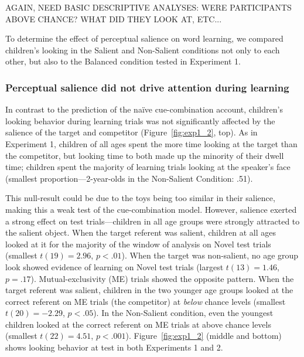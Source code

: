 \documentclass[man,floatsintext]{apa6}
\begin{document}
AGAIN, NEED BASIC DESCRIPTIVE ANALYSES: WERE PARTICIPANTS ABOVE CHANCE? WHAT DID THEY LOOK AT, ETC...

To determine the effect of perceptual salience on word learning, we compared children's looking in the Salient and Non-Salient conditions not only to each other, but also to the Balanced condition tested in Experiment 1. 

\subsubsection{Perceptual salience did not drive attention during learning} 

In contrast to the prediction of the na\"{i}ve cue-combination account, children's looking behavior during learning trials was not significantly affected by the salience of the target and competitor (Figure~\ref{fig:exp1_2}, top). As in Experiment 1, children of all ages spent the more time looking at the target than the competitor, but looking time to both made up the minority of their dwell time; children spent the majority of learning trials looking at the speaker's face (smallest proportion---2-year-olds in the Non-Salient Condition: .51).

This null-result could be due to the toys being too similar in their salience, making this a weak test of the cue-combination model. However, salience exerted a strong effect on test trials---children in all age groups were strongly attracted to the salient object. When the target referent was salient, children at all ages looked at it for the majority of the window of analysis on Novel test trials (smallest $t(19)  = 2.96$, $p < .01$). When the target was non-salient, no age group look showed evidence of learning on Novel test trials (largest $t(13)  = 1.46$, $p = .17$). Mutual-exclusivity (ME) trials showed the opposite pattern. When the target referent was salient, children in the two younger age groups looked at the correct referent on ME trials (the competitor) at \emph{below} chance levels (smallest $t(20) = -2.29$, $p < .05$). In the Non-Salient condition, even the youngest children looked at the correct referent on ME trials at above chance levels (smallest $t(22) = 4.51$, $p < .001$). Figure~\ref{fig:exp1_2} (middle and bottom) shows looking behavior at test in both Experiments 1 and 2.
\end{document}
